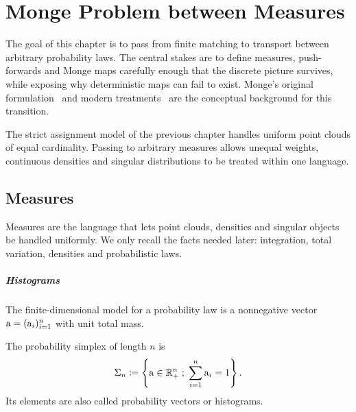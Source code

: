 
\chapter{Monge Problem between Measures}
\label{sec-monge}

The goal of this chapter is to pass from finite matching to transport between arbitrary probability laws. The central stakes are to define measures, push-forwards and Monge maps carefully enough that the discrete picture survives, while exposing why deterministic maps can fail to exist. Monge's original formulation~\cite{Monge1781} and modern treatments~\cite{Villani03,Villani09,SantambrogioBook,rachev1998mass} are the conceptual background for this transition.

The strict assignment model of the previous chapter handles uniform point clouds of equal cardinality. Passing to arbitrary measures allows unequal weights, continuous densities and singular distributions to be treated within one language.

\section{Measures}
\label{sec-measures}

Measures are the language that lets point clouds, densities and singular objects be handled uniformly. We only recall the facts needed later: integration, total variation, densities and probabilistic laws.

\paragraph{Histograms}

The finite-dimensional model for a probability law is a nonnegative vector $\mathrm{a}=(\mathrm{a}_i)_{i=1}^n$ with unit total mass.

\begin{defn}\label{def-probability-simplex}
	The probability simplex of length $n$ is
	\[
		\Sigma_n \coloneqq \left\{ \mathrm{a} \in \mathbb{R}_+^n \;;\;  \sum_{i=1}^n \mathrm{a}_i = 1  \right\}.
	\]
	Its elements are also called probability vectors or histograms.
\end{defn}

